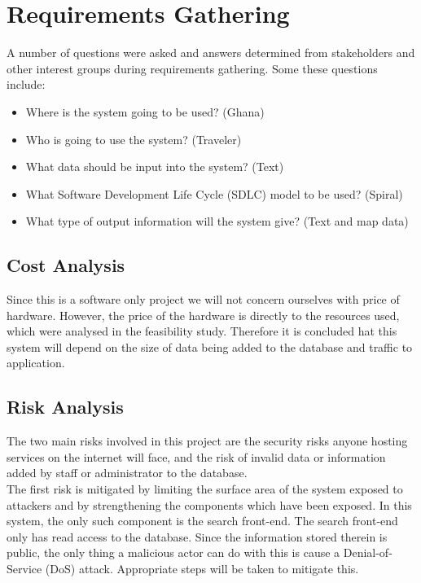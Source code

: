 \section{Requirements Gathering}
A number of questions were asked and answers determined from stakeholders and other interest groups during requirements gathering. Some these questions include:
		\begin{itemize}		
			\item Where is the system going to be used? (Ghana)
			\item Who is going to use the system? (Traveler)
			\item What data should be input into the system? (Text)
			\item What Software Development Life Cycle (SDLC) model to be used? (Spiral)
			\item What type of output information will the system give? (Text and map data)
		\end{itemize}

\subsection{Cost Analysis}
Since this is a software only project we will not concern ourselves with price of hardware.  However, the price of the hardware is directly to the resources used, which were analysed in the feasibility study. Therefore it is concluded hat this system will depend on the size of data being added to the database and traffic to application.

\subsection{Risk Analysis}
The two main risks involved in this project are the security risks anyone hosting services on the internet will face, and the risk of invalid data or information added by staff or administrator to the database.\\

The first risk is mitigated by limiting the surface area of the system exposed to attackers and by strengthening the components which have been exposed. In this system, the only such component is the search front-end. The search front-end only has read access to the database. Since the information stored therein is public, the only thing a malicious actor can do with this is cause a Denial-of-Service (DoS) attack. Appropriate steps will be taken to mitigate this.\\


